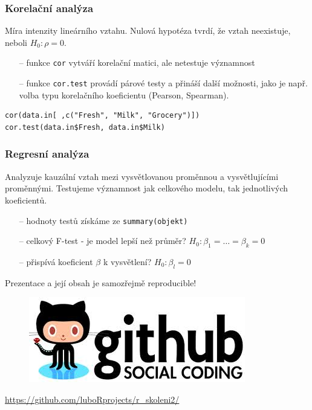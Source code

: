 \documentclass[10pt,xcolor={dvipsnames}]{beamer}
\begin{document}

\begin{frame}[fragile]
\frametitle{Korelační analýza}
Míra intenzity lineárního vztahu. Nulová hypotéza tvrdí, že vztah neexistuje, neboli $H_0: \rho=0$.
\begin{itemize}
\item[--] funkce \texttt{cor} vytváří korelační matici, ale netestuje významnost
\item[--] funkce \texttt{cor.test} provádí párové testy a přináší další možnosti, jako je např. volba typu korelačního koeficientu (Pearson, Spearman). 
\end{itemize}
\begin{verbatim}
cor(data.in[ ,c("Fresh", "Milk", "Grocery")])
cor.test(data.in$Fresh, data.in$Milk)
\end{verbatim}
\end{frame}


\begin{frame}[fragile]
\frametitle{Regresní analýza}
Analyzuje kauzální vztah mezi vysvětlovanou proměnnou a vysvětlujícími proměnnými. \newline\smallskip
Testujeme významnost jak celkového modelu, tak jednotlivých koeficientů.
\begin{itemize}
\item[--] hodnoty testů získáme ze \texttt{summary(objekt)}
\item[--] celkový F-test - je model lepší než průměr? $H_0: \beta_1=\ldots=\beta_k = 0$
\item[--] přispívá koeficient $\beta$ k vysvětlení? $H_0:\beta_l = 0$
\end{itemize}

\end{frame}


\begin{frame}
Prezentace a její obsah je samozřejmě reproducible!
\begin{figure}
\centering
\includegraphics[scale=0.7]{github_logo}
\end{figure}
\url{https://github.com/luboRprojects/r_skoleni2/}
\end{frame}
\end{document}
